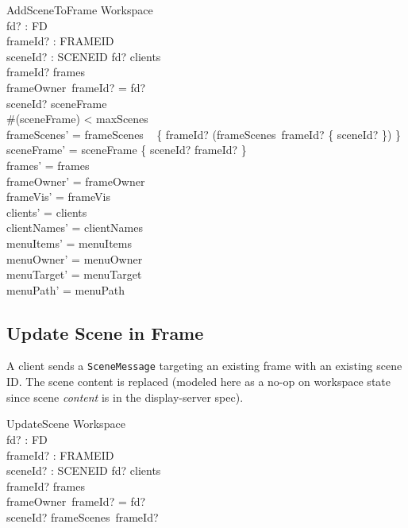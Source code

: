 \documentclass[a4paper,10pt,fleqn]{article}
\begin{document}
\begin{schema}{AddSceneToFrame}
  \Delta Workspace \\
  fd? : FD \\
  frameId? : FRAMEID \\
  sceneId? : SCENEID
  \where
  fd? \in clients \\
  frameId? \in frames \\
  frameOwner~frameId? = fd? \\
  sceneId? \notin \dom sceneFrame \\
  \#(\dom sceneFrame) < maxScenes \\
  frameScenes' = frameScenes \oplus
  \quad~ \{ frameId? \mapsto (frameScenes~frameId? \cup \{ sceneId? \}) \} \\
  sceneFrame' = sceneFrame \cup \{ sceneId? \mapsto frameId? \} \\
  frames' = frames \\
  frameOwner' = frameOwner \\
  frameVis' = frameVis \\
  clients' = clients \\
  clientNames' = clientNames \\
  menuItems' = menuItems \\
  menuOwner' = menuOwner \\
  menuTarget' = menuTarget \\
  menuPath' = menuPath
\end{schema}

\subsection{Update Scene in Frame}

A client sends a \texttt{SceneMessage} targeting an existing frame
with an existing scene ID.  The scene content is replaced (modeled
  here as a no-op on workspace state since scene \emph{content}
is in the display-server spec).

\begin{schema}{UpdateScene}
  \Xi Workspace \\
  fd? : FD \\
  frameId? : FRAMEID \\
  sceneId? : SCENEID
  \where
  fd? \in clients \\
  frameId? \in frames \\
  frameOwner~frameId? = fd? \\
  sceneId? \in frameScenes~frameId?
\end{schema}
\end{document}
